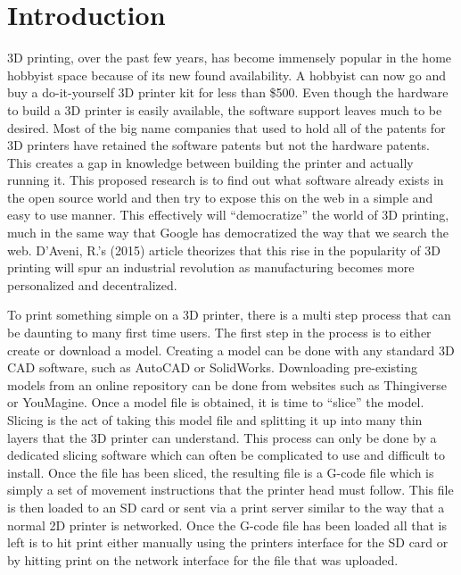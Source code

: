 \chapter{Introduction}
3D printing, over the past few years, has become immensely popular in the home hobbyist space because of its new found availability. A hobbyist can now go and buy a do-it-yourself 3D printer kit for less than \$500. Even though the hardware to build a 3D printer is easily available, the software support leaves much to be desired. Most of the big name companies that used to hold all of the patents for 3D printers have retained the software patents but not the hardware patents. This creates a gap in knowledge between building the printer and actually running it. This proposed research is to find out what software already exists in the open source world and then try to expose this on the web in a simple and easy to use manner. This effectively will “democratize” the world of 3D printing, much in the same way that Google has democratized the way that we search the web. D'Aveni, R.’s (2015) article theorizes that this rise in the popularity of 3D printing will spur an industrial revolution as manufacturing becomes more personalized and decentralized.

To print something simple on a 3D printer, there is a multi step process that can be daunting to many first time users. The first step in the process is to either create or download a model. Creating a model can be done with any standard 3D CAD software, such as AutoCAD or SolidWorks. Downloading pre-existing models from an online repository can be done from websites such as Thingiverse or YouMagine. Once a model file is obtained, it is time to “slice” the model. Slicing is the act of taking this model file and splitting it up into many thin layers that the 3D printer can understand. This process can only be done by a dedicated slicing software which can often be complicated to use and difficult to install. Once the file has been sliced, the resulting file is a G-code file which is simply a set of movement instructions that the printer head must follow. This file is then loaded to an SD card or sent via a print server similar to the way that a normal 2D printer is networked. Once the G-code file has been loaded all that is left is to hit print either manually using the printers interface for the SD card or by hitting print on the network interface for the file that was uploaded.


